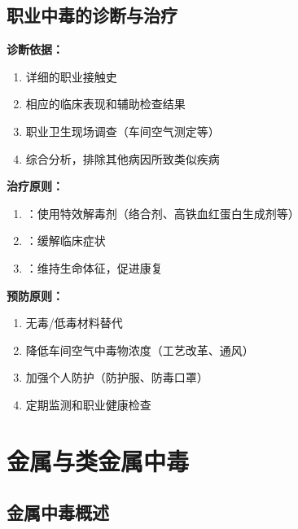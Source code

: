 \subsection{职业中毒的诊断与治疗}

\begin{keybox}
\textbf{诊断依据：}
\begin{enumerate}[leftmargin=*]
    \item 详细的职业接触史
    \item 相应的临床表现和辅助检查结果
    \item 职业卫生现场调查（车间空气测定等）
    \item 综合分析，排除其他病因所致类似疾病
\end{enumerate}

\textbf{治疗原则：}
\begin{enumerate}[leftmargin=*]
    \item {}：使用特效解毒剂（络合剂、高铁血红蛋白生成剂等）
    \item {}：缓解临床症状
    \item {}：维持生命体征，促进康复
\end{enumerate}

\textbf{预防原则：}
\begin{enumerate}[leftmargin=*]
    \item 无毒/低毒材料替代
    \item 降低车间空气中毒物浓度（工艺改革、通风）
    \item 加强个人防护（防护服、防毒口罩）
    \item 定期监测和职业健康检查
\end{enumerate}
\end{keybox}

\section{金属与类金属中毒}

\subsection{金属中毒概述}

